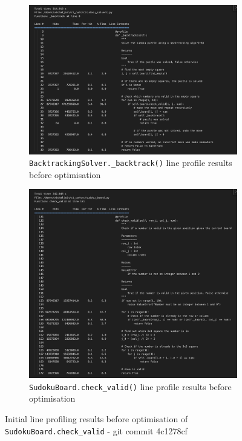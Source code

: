 \documentclass[11pt]{article}
\begin{document}
\begin{figure}[H]
    \centering
    \begin{subfigure}[b]{0.67\textwidth}
        \includegraphics[width=\textwidth]{figs/bt_line_profile_before.png}
        \caption{\texttt{BacktrackingSolver.\_backtrack()} line profile results before optimisation}
        \label{fig:backtrack_before}
    \end{subfigure}
    \begin{subfigure}[b]{0.67\textwidth}
        \includegraphics[width=\textwidth]{figs/check_valid_before.png}
        \caption{\texttt{SudokuBoard.check\_valid()} line profile results before optimisation}
        \label{fig:check_valid_before}
    \end{subfigure}
    \caption{Initial line profiling results before optimisation of \texttt{SudokuBoard.check\_valid} - git commit 4c1278cf}
    \label{fig:line_profiling_initial}
\end{figure}
\end{document}
